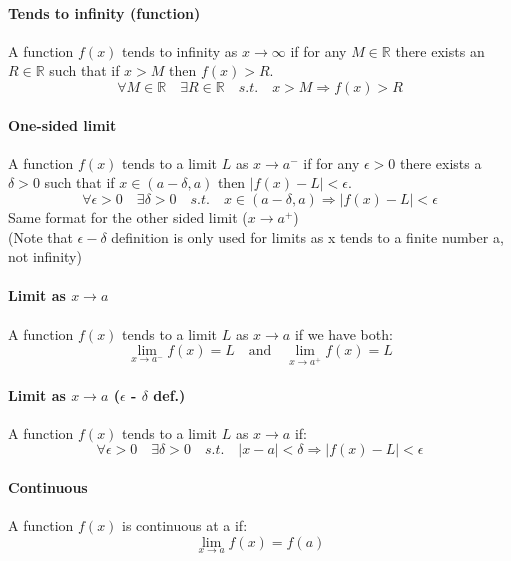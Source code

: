\documentclass{scrartcl}
\newcommand{\R}{\mathbb{R}}
\begin{document}
\paragraph{Tends to infinity (function)}
A function $ f(x) $ tends to infinity as $ x \to \infty $ if for any $ M \in \R $ there exists an $ R \in \R $ such that if $ x > M $ then $ f(x) > R $.
\begin{equation}
\forall M \in \R \quad \exists R \in \R \quad s.t. \quad x > M \Rightarrow f(x) > R
\end{equation}
\paragraph{One-sided limit}
A function $ f(x) $ tends to a limit $ L $ as $ x \to a^{-} $ if for any $ \epsilon > 0 $ there exists a $ \delta > 0 $ such that if $ x \in (a - \delta, a) $ then $ |f(x) - L| < \epsilon $.
\begin{equation}
\forall \epsilon > 0 \quad \exists \delta > 0 \quad s.t. \quad x \in (a - \delta, a) \Rightarrow |f(x) - L| < \epsilon
\end{equation}
\noindent Same format for the other sided limit ($ x \to a^{+} $)
\\
(Note that $ \epsilon - \delta $ definition is only used for limits as x tends to a finite number a, not infinity)
\paragraph{Limit as $ x \to a $}
A function $ f(x) $ tends to a limit $ L $ as $ x \to a $ if we have both:
\begin{equation}
\lim_{x \to a^{-}}f(x) = L \quad \textrm{and} \quad \lim_{x \to a^{+}}f(x) = L
\end{equation}
\paragraph{Limit as $ x \to a $ ($ \epsilon $ - $ \delta $ def.)}
A function $ f(x) $ tends to a limit $ L $ as $ x \to a $ if:
\begin{equation}
\forall \epsilon > 0 \quad \exists \delta > 0 \quad s.t. \quad |x - a| < \delta \Rightarrow |f(x) - L| < \epsilon
\end{equation}
\paragraph{Continuous}
A function $ f(x) $ is continuous at a if:
\begin{equation}
\lim_{x \to a}f(x) = f(a)
\end{equation}
\end{document}
